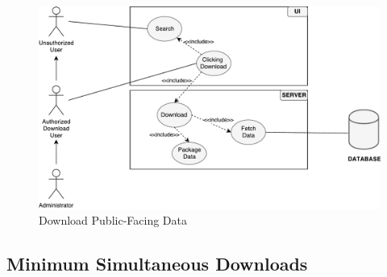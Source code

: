 \documentclass{article}
\begin{document}
\begin{figure}[H]
	\begin{center}
		\caption{Download Public-Facing Data}
		\label{FR1-use-case}
		\includegraphics[width=\textwidth]{images/download-use-case.pdf}
	\end{center}
\end{figure}

\clearpage

\subsection{Minimum Simultaneous Downloads}
\end{document}
